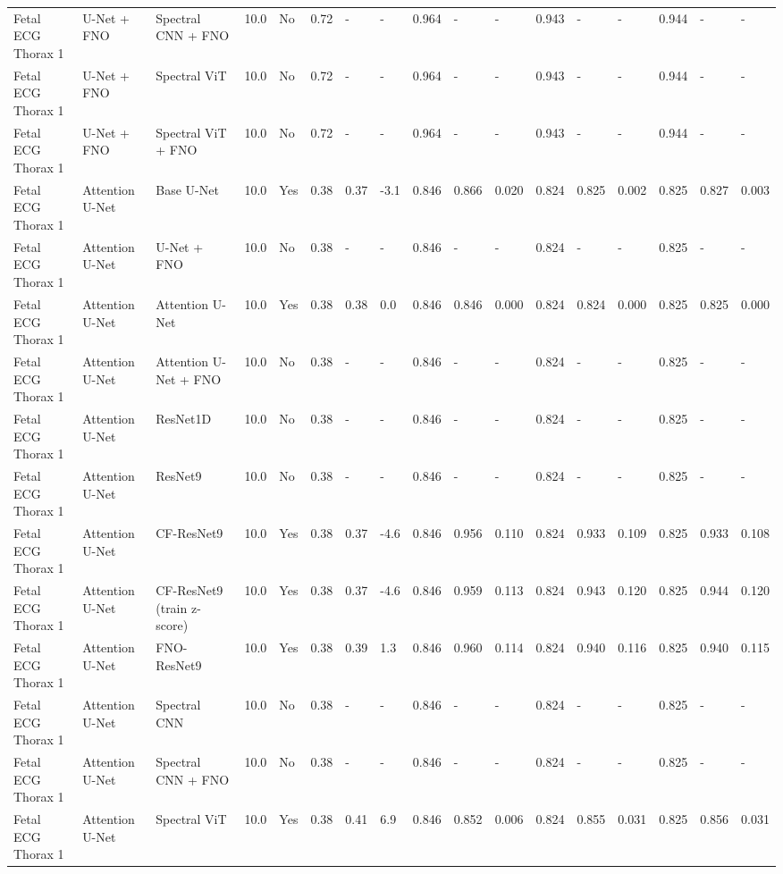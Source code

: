 \begin{longtable}{lllllllllllllllll}
Fetal ECG Thorax 1 & U-Net + FNO & Spectral CNN + FNO & 10.0 & No & 0.72 & - & - & 0.964 & - & - & 0.943 & - & - & 0.944 & - & - \\
Fetal ECG Thorax 1 & U-Net + FNO & Spectral ViT & 10.0 & No & 0.72 & - & - & 0.964 & - & - & 0.943 & - & - & 0.944 & - & - \\
Fetal ECG Thorax 1 & U-Net + FNO & Spectral ViT + FNO & 10.0 & No & 0.72 & - & - & 0.964 & - & - & 0.943 & - & - & 0.944 & - & - \\
Fetal ECG Thorax 1 & Attention U-Net & Base U-Net & 10.0 & Yes & 0.38 & 0.37 & -3.1 & 0.846 & 0.866 & 0.020 & 0.824 & 0.825 & 0.002 & 0.825 & 0.827 & 0.003 \\
Fetal ECG Thorax 1 & Attention U-Net & U-Net + FNO & 10.0 & No & 0.38 & - & - & 0.846 & - & - & 0.824 & - & - & 0.825 & - & - \\
Fetal ECG Thorax 1 & Attention U-Net & Attention U-Net & 10.0 & Yes & 0.38 & 0.38 & 0.0 & 0.846 & 0.846 & 0.000 & 0.824 & 0.824 & 0.000 & 0.825 & 0.825 & 0.000 \\
Fetal ECG Thorax 1 & Attention U-Net & Attention U-Net + FNO & 10.0 & No & 0.38 & - & - & 0.846 & - & - & 0.824 & - & - & 0.825 & - & - \\
Fetal ECG Thorax 1 & Attention U-Net & ResNet1D & 10.0 & No & 0.38 & - & - & 0.846 & - & - & 0.824 & - & - & 0.825 & - & - \\
Fetal ECG Thorax 1 & Attention U-Net & ResNet9 & 10.0 & No & 0.38 & - & - & 0.846 & - & - & 0.824 & - & - & 0.825 & - & - \\
Fetal ECG Thorax 1 & Attention U-Net & CF-ResNet9 & 10.0 & Yes & 0.38 & 0.37 & -4.6 & 0.846 & 0.956 & 0.110 & 0.824 & 0.933 & 0.109 & 0.825 & 0.933 & 0.108 \\
Fetal ECG Thorax 1 & Attention U-Net & CF-ResNet9 (train z-score) & 10.0 & Yes & 0.38 & 0.37 & -4.6 & 0.846 & 0.959 & 0.113 & 0.824 & 0.943 & 0.120 & 0.825 & 0.944 & 0.120 \\
Fetal ECG Thorax 1 & Attention U-Net & FNO-ResNet9 & 10.0 & Yes & 0.38 & 0.39 & 1.3 & 0.846 & 0.960 & 0.114 & 0.824 & 0.940 & 0.116 & 0.825 & 0.940 & 0.115 \\
Fetal ECG Thorax 1 & Attention U-Net & Spectral CNN & 10.0 & No & 0.38 & - & - & 0.846 & - & - & 0.824 & - & - & 0.825 & - & - \\
Fetal ECG Thorax 1 & Attention U-Net & Spectral CNN + FNO & 10.0 & No & 0.38 & - & - & 0.846 & - & - & 0.824 & - & - & 0.825 & - & - \\
Fetal ECG Thorax 1 & Attention U-Net & Spectral ViT & 10.0 & Yes & 0.38 & 0.41 & 6.9 & 0.846 & 0.852 & 0.006 & 0.824 & 0.855 & 0.031 & 0.825 & 0.856 & 0.031 \\

\end{longtable}
